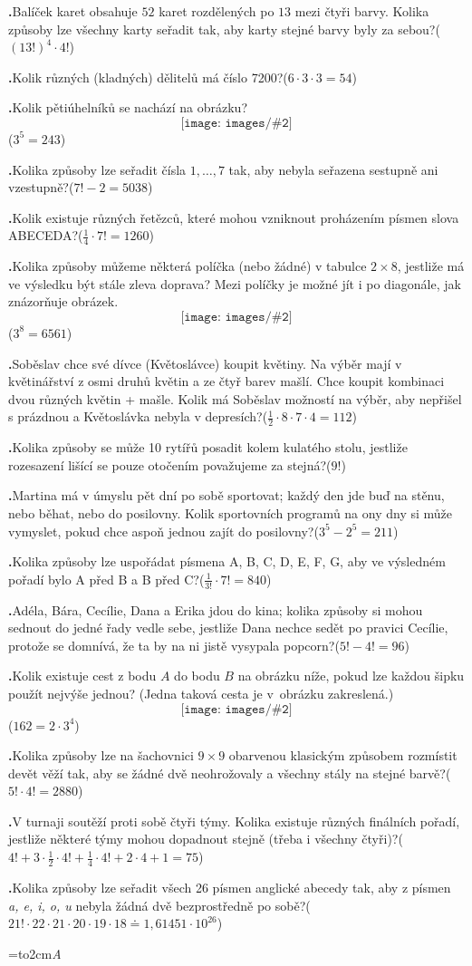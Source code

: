 \documentclass[12pt,a4paper]{extarticle}
\newcommand{\centeredgraphics}[2][]{\[\texttt{[image: images/\#2]}\]}
\def\printtym#1{\setbox\teambox=\hbox to2cm{\huge\textsl{#1}\hfil}\dp\teambox=0pt\relax\def\tym{#1}%
\pr0\relax\priklady\vfill\newpage}
\def\priklad#1#2{\advance\pr1 \textbf{\the\pr.}\space\ignorespaces#1\qquad (#2)\par\bigskip}
\begin{document}
{\priklad{Balíček karet obsahuje $52$ karet rozdělených po $13$ mezi čtyři barvy. Kolika způsoby lze všechny karty seřadit tak, aby karty stejné barvy byly za sebou?}{$(13!)^4 \cdot 4!$}
\priklad{Kolik různých (kladných) dělitelů má číslo 7200?}{$6 \cdot 3 \cdot 3 = 54$}
\priklad{Kolik pětiúhelníků se nachází na obrázku?%
\centeredgraphics[width=3cm]{5uhelniky.png}}{$3^5=243$}
\priklad{Kolika způsoby lze seřadit čísla $1,\dots,7$ tak, aby nebyla seřazena sestupně ani vzestupně?}{$7!-2 =  5038$}
\priklad{Kolik existuje různých řetězců, které mohou vzniknout proházením písmen slova ABECEDA?}{$\frac14 \cdot 7! = 1260$}
\priklad{Kolika způsoby můžeme  některá políčka (nebo žádné) v tabulce $2 \times 8$, jestliže má ve výsledku být stále \uv{průchozí} zleva doprava? Mezi políčky je možné jít i po diagonále, jak znázorňuje obrázek.
\centeredgraphics{42p3.pdf}}{$3^8=6561$}
\priklad{Soběslav chce své dívce (Květoslávce) koupit květiny. Na výběr mají v květinářství z osmi druhů květin a ze čtyř barev mašlí. Chce koupit kombinaci dvou různých květin + mašle. Kolik má Soběslav možností na výběr, aby nepřišel s prázdnou a Květoslávka nebyla v depresích?}{$\frac12 \cdot 8 \cdot 7 \cdot 4 = 112$}
\priklad{Kolika způsoby se může 10 rytířů posadit kolem kulatého stolu, jestliže rozesazení lišící se pouze otočením považujeme za stejná?}{$9!$}
\priklad{Martina má v úmyslu pět dní po sobě sportovat; každý den jde buď na stěnu, nebo běhat, nebo do posilovny. Kolik sportovních programů na ony dny si může vymyslet, pokud chce aspoň jednou zajít do posilovny?}{$3^5 - 2^5 = 211$}
\priklad{Kolika způsoby lze uspořádat písmena A, B, C, D, E, F, G, aby ve výsledném pořadí bylo A před B a B před C?}{$\frac1{3!}\cdot 7! = 840$}
\priklad{Adéla, Bára, Cecílie, Dana a Erika jdou do kina; kolika způsoby si mohou sednout do jedné řady vedle sebe, jestliže Dana nechce sedět po pravici Cecílie, protože se domnívá, že ta by na ni jistě vysypala popcorn?}{$5! - 4! = 96$}
\priklad{Kolik existuje cest z bodu $A$ do bodu $B$ na obrázku níže, pokud lze každou šipku použít nejvýše jednou? (Jedna taková cesta je v~obrázku zakreslená.)%
\centeredgraphics{how_many_paths.pdf}}{$162=2\cdot 3^4$}
\priklad{Kolika způsoby lze na šachovnici $9 \times 9$ obarvenou klasickým způsobem rozmístit devět věží tak, aby se žádné dvě neohrožovaly a všechny stály na stejné barvě?}{$5!\cdot4! = 2880$}
\priklad{V turnaji soutěží proti sobě čtyři týmy. Kolika existuje různých finálních pořadí, jestliže některé týmy mohou dopadnout stejně (třeba i všechny čtyři)?}{$4! + 3\cdot\frac12 \cdot 4! + \frac14\cdot 4! + 2\cdot4 + 1 = 75$} %
\priklad{Kolika způsoby lze seřadit všech 26 písmen anglické abecedy tak, aby z písmen \emph{a, e, i, o, u} nebyla žádná dvě bezprostředně po sobě?}{$21! \cdot 22 \cdot21 \cdot20 \cdot19 \cdot 18 \doteq 1{,}61451\cdot 10^{26}$} %
}


\printtym{A}
\end{document}

